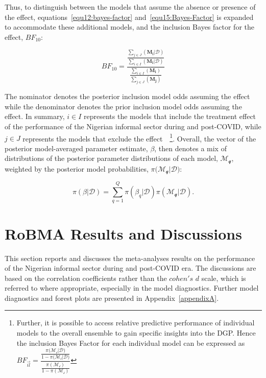 \documentclass[12pt, english]{article}
\begin{document}
    Thus, to distinguish between the models that assume the absence or presence of the effect, equations~\ref{equ12:bayes-factor} and~\ref{equ15:Bayes-Factor} is expanded to accommodate these additional models, and the inclusion Bayes factor for the effect, $BF_{10}:$

    \begin{equation}
        \label{equ17}
        BF_{10} = \dfrac{\frac{\sum_{j \in J}(\mathbf{M_i} | \mathcal{D})}{\sum_{i \in I}(\mathbf{M_i} | \mathcal{D})}}{\frac{\sum_{i \in I}(\mathbf{M_i})}{\sum_{j \in J}(\mathbf{M_j})}}
    \end{equation}

    The nominator denotes the posterior inclusion model odds assuming the effect while the denominator denotes the prior inclusion model odds assuming the effect. In summary, $i \in I$ represents the models that include the treatment effect of the performance of the Nigerian informal sector during and post-COVID, while $j \in J$ represents the models that exclude the effect~\parencites{gronau2021, hinne2020}~\footnote{Further, it is possible to access relative predictive performance of individual models to the overall ensemble to gain specific insights into the DGP. Hence the inclusion Bayes Factor for each individual model can be expressed as $BF_{\vec{\textit{il}}} = \dfrac{\frac{\pi(\mathcal{M_{\text{i}}|\mathcal{D})}}{1 - \pi(\mathcal{M_{\text{i}}|\mathcal{D})}}}{\frac{\pi(\mathcal{M_{\text{i}}})}{1 - \pi(\mathcal{M_{\text{i}}})}}$}. Overall, the vector of the posterior model-averaged parameter estimate, $\beta$, then denotes a mix of distributions of the posterior parameter distributions of each model, $\mathcal{M_{\text{q}}}$, weighted by the posterior model probabilities, $\pi(\mathcal{M_{\text{q}}|\mathcal{D})}:$

    \begin{equation}
        \label{equ18}
        \pi(\beta | \mathcal{D}) = \sum_{q = 1}^{Q} \pi(\beta_q | \mathcal{D}) \pi(\mathcal{M_\text{q}} | \mathcal{D}).
    \end{equation}


    \section{RoBMA Results and Discussions}\label{sec4:robma-results-and-discussion}
    This section reports and discusses the meta-analyses results on the performance of the Nigerian informal sector during and post-COVID era. The discussions are based on the correlation coefficients rather than the $cohen's$ $d$ scale, which is referred to where appropriate, especially in the model diagnostics. Further model diagnostics and forest plots are presented in Appendix~\ref{appendixA}.
\end{document}

